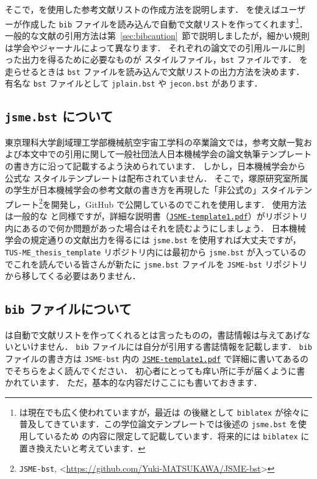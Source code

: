 そこで，\BibTeX を使用した参考文献リストの作成方法を説明します．
\BibTeX を使えばユーザーが作成した \verb|bib| ファイルを読み込んで自動で文献リストを作ってくれます\footnote{\BibTeX は現在でも広く使われていますが，最近は \BibTeX の後継として \texttt{biblatex} が徐々に普及してきています．この学位論文テンプレートでは後述の \texttt{jsme.bst} を使用しているため \BibTeX の内容に限定して記載しています．将来的には \texttt{biblatex} に置き換えたいと考えています．}．
一般的な文献の引用方法は第~\ref{sec:bibcaution}~節で説明しましたが，細かい規則は学会やジャーナルによって異なります．
それぞれの論文での引用ルールに則った出力を得るために必要なものが \BibTeX スタイルファイル，\verb|bst| ファイルです．
\BibTeX を走らせるときは \verb|bst| ファイルを読み込んで文献リストの出力方法を決めます．
有名な \verb|bst| ファイルとして \verb|jplain.bst| や \verb|jecon.bst| があります．

\subsection{\texttt{jsme.bst} について}
\label{ssec:jsme-bst}

東京理科大学創域理工学部機械航空宇宙工学科の卒業論文では，参考文献一覧および本文中での引用に関して一般社団法人日本機械学会の論文執筆テンプレートの書き方に沿って記載するよう決められています．
しかし，日本機械学会から公式な \BibTeX スタイルテンプレートは配布されていません．
そこで，塚原研究室所属の学生が日本機械学会の参考文献の書き方を再現した「非公式の」\BibTeX スタイルテンプレート\footnote{\texttt{JSME-bst}, \textless\url{https://github.com/Yuki-MATSUKAWA/JSME-bst}\textgreater}を開発し，GitHub で公開しているのでこれを使用します．
使用方法は一般的な \BibTeX と同様ですが，詳細な説明書（\href{https://github.com/Yuki-MATSUKAWA/JSME-bst/blob/main/JSME-template1.pdf}{\texttt{JSME-template1.pdf}}）がリポジトリ内にあるので何か問題があった場合はそれを読むようにしましょう．
日本機械学会の規定通りの文献出力を得るには \verb|jsme.bst| を使用すれば大丈夫ですが，\verb|TUS-ME_thesis_template| リポジトリ内には最初から \verb|jsme.bst| が入っているのでこれを読んでいる皆さんが新たに \verb|jsme.bst| ファイルを \verb|JSME-bst| リポジトリから移してくる必要はありません．

\subsection{\texttt{bib} ファイルについて}
\label{ssec:bib-file}

\BibTeX は自動で文献リストを作ってくれるとは言ったものの，書誌情報は与えてあげないといけません．
\verb|bib| ファイルには自分が引用する書誌情報を記載します．
\verb|bib| ファイルの書き方は \verb|JSME-bst| 内の \href{https://github.com/Yuki-MATSUKAWA/JSME-bst/blob/main/JSME-template1.pdf}{\texttt{JSME-template1.pdf}} で詳細に書いてあるのでそちらをよく読んでください．
\BibTeX 初心者にとっても痒い所に手が届くように書かれています．
ただ，基本的な内容だけここにも書いておきます．

